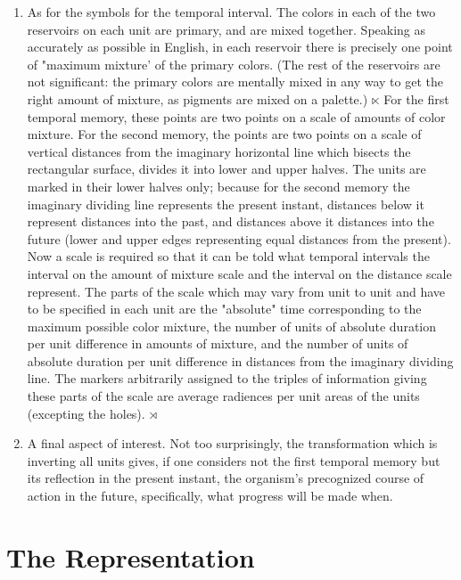 \begin{enumerate}
\item As for the symbols for the temporal interval. The colors in each of 
the two reservoirs on each unit are primary, and are mixed together. 
Speaking as accurately as possible in English, in each reservoir there is 
precisely one point of "maximum mixture' of the primary colors. (The rest 
of the reservoirs are not significant: the primary colors are mentally mixed in 
any way to get the right amount of mixture, as pigments are mixed on a 
palette.) $\ltimes$ For the first temporal memory, these points are two points on a 
scale of amounts of color mixture. For the second memory, the points are 
two points on a scale of vertical distances from the imaginary horizontal line 
which bisects the rectangular surface, divides it into lower and upper halves. 
The units are marked in their lower halves only; because for the second 
memory the imaginary dividing line represents the present instant, distances 
below it represent distances into the past, and distances above it distances 
into the future (lower and upper edges representing equal distances from the 
present). Now a scale is required so that it can be told what temporal 
intervals the interval on the amount of mixture scale and the interval on the 
distance scale represent. The parts of the scale which may vary from unit to 
unit and have to be specified in each unit are the "absolute" time 
corresponding to the maximum possible color mixture, the number of units 
of absolute duration per unit difference in amounts of mixture, and the 
number of units of absolute duration per unit difference in distances from 
the imaginary dividing line. The markers arbitrarily assigned to the triples of 
information giving these parts of the scale are average radiences per unit 
areas of the units (excepting the holes). $\rtimes$

\item A final aspect of interest. Not too surprisingly, the transformation 
which is inverting all units gives, if one considers not the first temporal 
memory but its reflection in the present instant, the organism's precognized 
course of action in the future, specifically, what progress will be made when. 
\end{enumerate}


\section*{The Representation}


